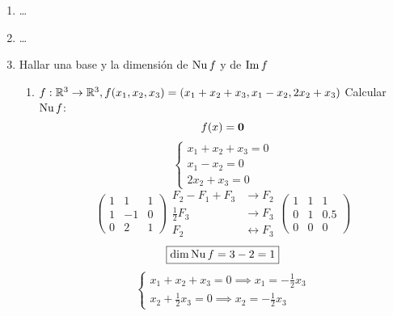\documentclass[../practica.root.tex]{subfiles}
\begin{document}
\begin{enumerate}
\begin{enumerate}
          \end{enumerate}
    \item \dots
    \item \dots
    \item Hallar una base y la dimensión de $\operatorname{Nu} f$ y de $\operatorname{Im} f$
          \begin{enumerate}
              \item $ f : \mathbb{R}^3 \to \mathbb{R}^3, f(x_1,x_2,x_3) = (x_1 + x_2 + x_3, x_1 - x_2, 2x_2 + x_3) $
                    Calcular $\operatorname{Nu} f$:
                    \[ f(x) = \mathbf{0} \]
                    \[
                        \begin{cases}
                            x_1 + x_2 + x_3 = 0 \\
                            x_1 - x_2 = 0       \\
                            2x_2 + x_3 = 0
                        \end{cases}
                    \] \[
                        \begin{pmatrix}
                            1 & 1  & 1 \\
                            1 & -1 & 0 \\
                            0 & 2  & 1
                        \end{pmatrix}
                        \begin{array}{rl}
                            F_2 - F_1 + F_3 & \to F_2             \\
                            \frac{1}{2}F_3  & \to F_3             \\
                            F_2             & \leftrightarrow F_3
                        \end{array}
                        \begin{pmatrix}
                            1 & 1 & 1   \\
                            0 & 1 & 0.5 \\
                            0 & 0 & 0
                        \end{pmatrix}
                    \] \[
                        \boxed{\dim\operatorname{Nu}{f} = 3 - 2 = 1}
                    \] \[
                        \begin{cases}
                            x_1 + x_2 + x_3 = 0 \implies x_1 = -\frac{1}{2}x_3 \\
                            x_2 + \frac{1}{2}x_3 = 0 \implies x_2 = -\frac{1}{2}x_3
                        \end{cases}
\]
\end{enumerate}
\end{enumerate}
\end{document}
